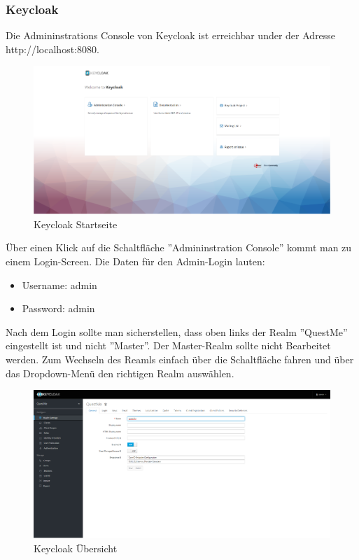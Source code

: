 \subsubsection{Keycloak}
Die Admininstrations Console von Keycloak ist erreichbar under der Adresse http://localhost:8080. 

\begin{figure}[H]
    \centering
    \includegraphics[width=1.0\textwidth]{bilder/administrationshandbuch/keycloak_startseite.png}
    \caption{Keycloak Startseite}
    \label{fig:Keycloak_Startseite}
\end{figure}

\noindent Über einen Klick auf die Schaltfläche ''Admininstration Console'' kommt man zu einem Login-Screen.
Die Daten für den Admin-Login lauten: 
\begin{itemize}
    \item Username: admin
    \item Password: admin
\end{itemize}

\noindent Nach dem Login sollte man sicherstellen, dass oben links der Realm ''QuestMe'' eingestellt ist 
und nicht ''Master''. Der Master-Realm sollte nicht Bearbeitet werden. 
Zum Wechseln des Reamls einfach über die Schaltfläche fahren und über das Dropdown-Menü den richtigen Realm auswählen. 

\begin{figure}[H]
    \centering
    \includegraphics[width=1.0\textwidth]{bilder/administrationshandbuch/keycloak_nach_login.png}
    \caption{Keycloak Übersicht}
    \label{fig:Keycloak_Uebersicht}
\end{figure}

